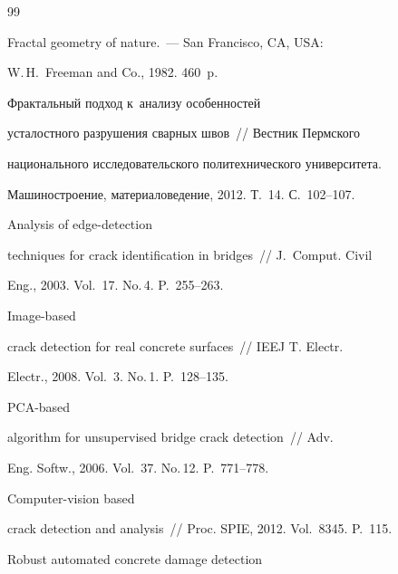 {\small\frenchspacing


{%




\begin{thebibliography}{99}




 Fractal geometry of nature.~--- San Francisco, CA, USA: 


W.\,H.~Freeman and Co., 1982. 460~p.




 Фрактальный подход к~анализу особенностей 


усталостного разрушения сварных швов~/\!\!/ Вестник Пермского 


национального исследовательского политехнического университета. 


Машиностроение, материаловедение, 2012. Т.~14. С.~102--107.




 Analysis of edge-detection 


techniques for crack identification in bridges~/\!\!/ J.~Comput. Civil 


Eng., 2003. Vol.~17. No.\,4. P.~255--263.




 Image-based 


crack detection for real concrete surfaces~/\!\!/ IEEJ T. Electr. 


Electr., 2008. Vol.~3. No.\,1. P.~128--135.




 PCA-based 


algorithm for unsupervised bridge crack detection~/\!\!/ Adv. 


Eng. Softw., 2006. Vol.~37. No.\,12. P.~771--778.




 Computer-vision based 


crack detection and analysis~/\!\!/ Proc. SPIE, 2012. Vol.~8345. P.~115.




 Robust automated concrete damage detection 



\end{thebibliography}}}

